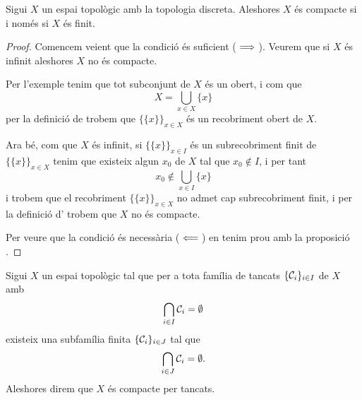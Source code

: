 \documentclass[../../Main.tex]{subfiles}
\begin{document}
	\begin{proposition}
		\label{prop:un espai topològic discret és compacte si i només si és finit}
		Sigui \(X\) un espai topològic amb la topologia discreta. Aleshores \(X\) és compacte si i només si \(X\) és finit.
		\begin{proof}
			Comencem veient que la condició és suficient (\(\implies\)). Veurem que si \(X\) és infinit aleshores \(X\) no és compacte.
			
			Per l'exemple  tenim que tot subconjunt de \(X\) és un obert, i com que
			\[
			    X=\bigcup_{x\in X}\{x\}
			\]
			per la definició de  trobem que \(\{\{x\}\}_{x\in X}\) és un recobriment obert de \(X\).
			
			Ara bé, com que \(X\) és infinit, si \(\{\{x\}\}_{x\in I}\) és un subrecobriment finit de \(\{\{x\}\}_{x\in X}\) tenim que existeix algun \(x_{0}\) de \(X\) tal que \(x_{0}\notin I\), i per tant
			\[
			    x_{0}\notin\bigcup_{x\in I}\{x\}
			\]
			i trobem que el recobriment \(\{\{x\}\}_{x\in X}\) no admet cap subrecobriment finit, i per la definició d' trobem que \(X\) no és compacte.
			
			Per veure que la condició és necessària (\(\impliedby\)) en tenim prou amb la proposició .
		\end{proof}
	\end{proposition}
	\begin{definition}
		\label{def:compacitat per tancats}
		\label{def:compacte per tancats}
		Sigui \(X\) un espai topològic tal que per a tota família de tancats \(\{\mathcal{C}_{i}\}_{i\in I}\) de \(X\) amb
		\[
		    \bigcap_{i\in I}\mathcal{C}_{i}=\emptyset
		\]
		existeix una subfamília finita \(\{\mathcal{C}_{i}\}_{i\in J}\) tal que
		\[
		    \bigcap_{i\in J}\mathcal{C}_{i}=\emptyset.
		\]
		Aleshores direm que \(X\) és compacte per tancats.
	\end{definition}
\end{document}
